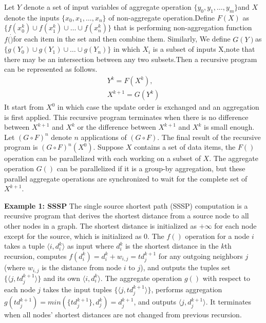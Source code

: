 \documentclass{vldb}
\begin{document}
Let $Y$ denote a set of input variables of aggregate operation $\{y_0,y_1,\dots,y_m\}$and $X$ denote the inputs $\{x_0,x_1,\dots,x_n\}$ of non-aggregate operation.Define $F(X)$ as $\{f(x_0^k) \cup f(x_1^k) \cup \dots \cup f(x_n^k)\}$ that is performing non-aggregation function $f(\dot)$for each item in the set and then combine them. Similarly, We define $G(Y)$as $\{g(Y_0) \cup g(Y_1) \cup \dots \cup g(Y_n)\}$ in which $X_i$ is a subset of inputs X,note that there may be an intersection between any two subsets.Then a recursive program can be represented as follows.
\begin{equation}
\label{eq:recursive2}
\begin{aligned}
Y^{k}=F(X^k),\\
X^{k+1}=G(Y^k)
\end{aligned}
\end{equation}
It  start from $X^0$ in which case the update order is exchanged and an aggregation is first applied. This recursive program terminates when there is no difference between $X^{k+1}$ and $X^k$ or the difference between $X^{k+1}$ and $X^k$ is small enough. Let $(G\circ F)^n$ denote $n$ applications of $(G\circ F)$. The final result of the recursive program is $(G\circ F)^n(X^0)$. Suppose $X$ contains a set of data items, the $F()$ operation can be parallelized with each working on a subset of $X$. The aggregate operation $G()$ can be parallelized if it is a group-by aggregation, but these parallel aggregate operations are synchronized to wait for the complete set of $X^{k+1}$.

\textbf{Example 1: SSSP} The single source shortest path (SSSP) computation is a recursive program that derives the shortest distance from a source node to all other nodes in a graph. The shortest distance is initialized as $+\infty$ for each node except for the source, which is initialized as 0. The $f()$ operation for a node $i$ takes a tuple $\langle i,d_i^k\rangle$ as input where $d_i^k$ is the shortest distance in the $k$th recursion, computes $f(d_i^k)=d_i^k+w_{i,j}=td_j^{k+1}$ for any outgoing neighbors $j$ (where $w_{i,j}$ is the distance from node $i$ to $j$), and outputs the tuples set $\{\langle j,td_j^{k+1}\rangle\}$ and its own $\langle i,d_i^k\rangle$. The aggregate operation $g()$ with respect to each node $j$ takes the input tuples $\{\langle j,td_j^{k+1}\rangle\}$, performs aggregation $g(td_j^{k+1})=min(\{td_j^{k+1}\},d_j^k)=d_j^{k+1}$, and outputs $\langle j,d_j^{k+1}\rangle$. It terminates when all nodes' shortest distances are not changed from previous recursion.
\end{document}
